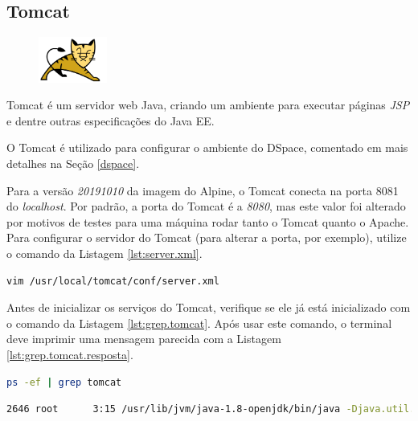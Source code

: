 \subsection{Tomcat}\label{tomcat}
\begin{figure} %
    \centering
    \includegraphics[width=0.2\textwidth]{../images/tomcat.png}
\end{figure}

Tomcat é um servidor web Java, criando um ambiente para executar páginas \textit{JSP} e dentre outras especificações do Java EE.

O Tomcat é utilizado para configurar o ambiente do DSpace, comentado em mais detalhes na Seção \ref{dspace}.

Para a versão \textit{20191010} da imagem do Alpine, o Tomcat conecta na porta 8081 do \textit{localhost}. Por padrão, a porta do Tomcat é a \textit{8080}, mas este valor foi alterado por motivos de testes para uma máquina rodar tanto o Tomcat quanto o Apache. Para configurar o servidor do Tomcat (para alterar a porta, por exemplo), utilize o comando da Listagem \ref{lst:server.xml}.

\begin{lstlisting}[language=bash, label=lst:server.xml, caption=Abrindo server.xml do Tomcat.]
    vim /usr/local/tomcat/conf/server.xml
\end{lstlisting}

Antes de inicializar os serviços do Tomcat, verifique se ele já está inicializado com o comando da Listagem \ref{lst:grep.tomcat}. Após usar este comando, o terminal deve imprimir uma mensagem parecida com a Listagem \ref{lst:grep.tomcat.resposta}.

\begin{lstlisting}[language=bash, label=lst:grep.tomcat, caption=Verificando se o TomCat está inicializado.]
    ps -ef | grep tomcat
\end{lstlisting}

\begin{lstlisting}[language=bash, breaklines=true, label=lst:grep.tomcat.resposta, caption=Parte de uma resposta de um Tomcat que já está rodando]
    2646 root      3:15 /usr/lib/jvm/java-1.8-openjdk/bin/java -Djava.util.logging.config.file=/usr/local/apache-tomcat-8.5.40/conf/logging.properties -Djava.util.logging.manager=org.apache.juli....
\end{lstlisting}

